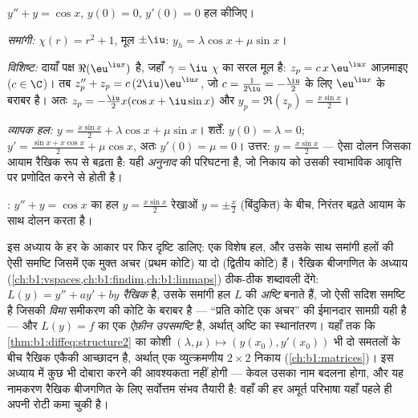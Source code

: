 \begin{example}[एक प्रणोदित दोलन]\label{ex:b1:diffeq:oscillation}
$y'' + y = \cos x$, $y(0) = 0$, $y'(0) = 0$ हल कीजिए।

\emph{समांगी:} $\chi(r) = r^2 + 1$, मूल $\pm\iu$: $y_h = \lambda\cos x + \mu
\sin x$।

\emph{विशिष्ट:} दायाँ पक्ष $\Re(\eu^{\iu x})$ है, जहाँ $\gamma = \iu$ $\chi$
का सरल मूल है: $z_p = c\, x\, \eu^{\iu x}$ आज़माइए ($c \in \C$)। तब $z_p'' +
z_p = c\,(2\iu)\eu^{\iu x}$, जो $c = \frac{1}{2\iu} = -\frac\iu2$ के लिए
$\eu^{\iu x}$ के बराबर है। अतः $z_p = -\frac{\iu}{2} x (\cos x + \iu \sin
x)$ और $y_p = \Re(z_p) = \frac{x \sin x}{2}$।

\emph{व्यापक हल:} $y = \frac{x\sin x}{2} + \lambda\cos x + \mu\sin x$।
शर्तें: $y(0) = \lambda = 0$; $y' = \frac{\sin x + x\cos x}{2} + \mu\cos x$,
अतः $y'(0) = \mu = 0$। उत्तर: $y = \frac{x\sin x}{2}$ --- ऐसा दोलन जिसका
आयाम रैखिक रूप से बढ़ता है: यही \emph{अनुनाद} की परिघटना है,
जो निकाय को उसकी स्वाभाविक आवृत्ति पर प्रणोदित करने से होती है।
\end{example}

\begin{omfigure}

{\small {}: $y'' + y = \cos x$ का हल $y = \frac{x \sin x}{2}$ रेखाओं $y
= \pm\frac x2$ (बिंदुकित) के बीच, निरंतर बढ़ते आयाम के साथ दोलन करता है।}
\end{omfigure}

\begin{remark}[मध्यांतर: रैखिकता एक ज्यामिति है]\label{rem:b1:diffeq:interlude}
इस अध्याय के हर  के आकार पर फिर दृष्टि डालिए: एक विशेष हल, और उसके
साथ समांगी हलों की ऐसी समष्टि जिसमें एक मुक्त अचर (प्रथम कोटि) या दो
(द्वितीय कोटि) हैं। रैखिक बीजगणित के अध्याय
(\cref{ch:b1:vspaces,ch:b1:findim,ch:b1:linmaps}) ठीक-ठीक शब्दावली देंगे:
 $L(y) = y'' + ay' + by$ \emph{रैखिक} है, उसके समांगी हल $L$ की
\emph{अष्टि} बनाते हैं, जो ऐसी सदिश समष्टि है जिसकी \emph{विमा} समीकरण की
कोटि के बराबर है --- ``प्रति कोटि एक अचर'' की ईमानदार सामग्री यही है --- और
$L(y) = f$ का  एक \emph{ऐफ़ीन उपसमष्टि} है, अर्थात् अष्टि का
स्थानांतरण। यहाँ तक कि \cref{thm:b1:diffeq:structure2} का कोशी 
$(\lambda, \mu) \mapsto (y(x_0), y'(x_0))$ भी दो समतलों के बीच रैखिक एकैकी
आच्छादन है, अर्थात् एक व्युत्क्रमणीय $2 \times 2$ निकाय
(\cref{ch:b1:matrices})। इस अध्याय में कुछ भी दोबारा करने की आवश्यकता नहीं
होगी --- केवल उसका नाम बदलना होगा, और यह नामकरण रैखिक बीजगणित के लिए
सर्वोत्तम संभव तैयारी है: वहाँ की हर अमूर्त परिभाषा यहाँ पहले ही अपनी रोटी
कमा चुकी है।
\end{remark}

